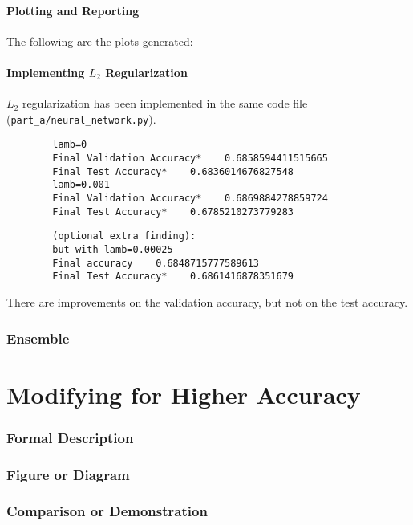 \documentclass{article}
\begin{document}
    \subsection{Plotting and Reporting}
    The following are the plots generated:

    
    \subsection{Implementing $L_2$ Regularization}
    $L_2$ regularization has been implemented in the same code file (\verb|part_a/neural_network.py|).

    \begin{verbatim}
        lamb=0
        Final Validation Accuracy*    0.6858594411515665
        Final Test Accuracy*    0.6836014676827548
        lamb=0.001
        Final Validation Accuracy*    0.6869884278859724
        Final Test Accuracy*    0.6785210273779283
    \end{verbatim}

    \begin{verbatim}
        (optional extra finding):
        but with lamb=0.00025
        Final accuracy    0.6848715777589613
        Final Test Accuracy*    0.6861416878351679
    \end{verbatim}

    There are improvements on the validation accuracy, but not on the test accuracy.


    \pagebreak

    \section{Ensemble}

    \pagebreak

    \part{Modifying for Higher Accuracy}
    \section{Formal Description}
    \section{Figure or Diagram}
    \section{Comparison or Demonstration}
\end{document}
